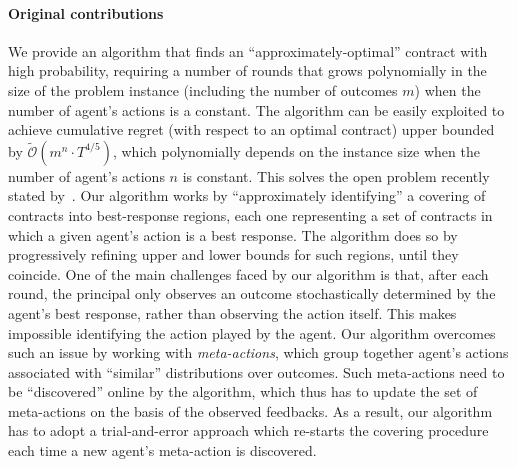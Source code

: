 \paragraph{Original contributions}
%
We provide an algorithm that finds an ``approximately-optimal'' contract with high probability, requiring a number of rounds that grows polynomially in the size of the problem instance (including the number of outcomes $m$) when the number of agent's actions is a constant.
%
The algorithm can be easily exploited to achieve cumulative regret (with respect to an optimal contract) upper bounded by $\widetilde{\mathcal{O}}(m^n \cdot T^{4/5})$, which polynomially depends on the instance size when the number of agent's actions $n$ is constant.
%
This solves the open problem recently stated by~\citet{zhu2022sample}.
%
Our algorithm works by ``approximately identifying'' a covering of contracts into best-response regions, each one representing a set of contracts in which a given agent's action is a best response. 
%
The algorithm does so by progressively refining upper and lower bounds for such regions, until they coincide.
%
One of the main challenges faced by our algorithm is that, after each round, the principal only observes an outcome stochastically determined by the agent's best response, rather than observing the action itself.
%
This makes impossible identifying the action played by the agent.
%
Our algorithm overcomes such an issue by working with \emph{meta-actions}, which group together agent's actions associated with ``similar'' distributions over outcomes.
%
Such meta-actions need to be ``discovered'' online by the algorithm, which thus has to update the set of meta-actions on the basis of the observed feedbacks. 
%
As a result, our algorithm has to adopt a trial-and-error approach which re-starts the covering procedure each time a new agent's meta-action is discovered.
%
%
%
%
%
%
%
%
%

